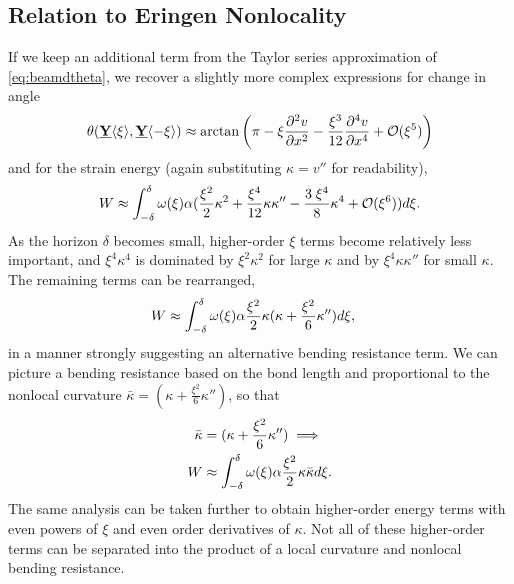 \subsection{Relation to Eringen Nonlocality}
\label{sec:EringenCompare}
If we keep an additional term from the Taylor series approximation of \cref{eq:beamdtheta}, we recover a slightly more complex expressions for change in angle
%
\begin{equation}
\label{eq:beamdthetaHOT}
\theta(\vstate{Y}{}{\xi},\vstate{Y}{}{\mathbf{-\xi}}) \approx \arctan\left(\pi-\xi \frac{\partial^2 v}{\partial x^2} -\frac{\xi^3}{12} \frac{\partial^4 v}{\partial x^4}  +\mathcal{O}(\xi^5)\right)\notag
\end{equation}
%
and for the strain energy (again substituting \(\kappa = v''\) for readability),
%
%
%
\begin{equation}
W \approx \int_{-\delta}^\delta \omega(\xi)\alpha(\frac{\xi^2}{2}\kappa^2+\frac{\xi^4}{12}\kappa\kappa''-\frac{3\; \xi^4}{8}\kappa^4+\mathcal{O}(\xi^6)) d\xi.\notag
\end{equation}
%
As the horizon \(\delta\) becomes small, higher-order \(\xi\) terms become relatively less important, and \(\xi^4\kappa^4\) is dominated by \(\xi^2\kappa^2\) for large \(\kappa\) and by \(\xi^4\kappa\kappa''\) for small \(\kappa\).
The remaining terms can be rearranged,
\begin{align}
W &\approx \int_{-\delta}^\delta \omega(\xi)\alpha \frac{\xi^2}{2}\kappa(\kappa + \frac{\xi^2}{6}\kappa'') d\xi, \notag
\end{align}
in a manner strongly suggesting an alternative bending resistance term.
We can picture a bending resistance based on the bond length and proportional to the nonlocal curvature  \(\bar{\kappa}=(\kappa + \frac{\xi^2}{6}\kappa'')\), so that 
%
\begin{align}
\label{eq:NLbending}
\bar{\kappa}&=(\kappa + \frac{\xi^2}{6}\kappa'') \implies  \\
W &\approx \int_{-\delta}^\delta \omega(\xi)\alpha \frac{\xi^2}{2}\kappa\bar{\kappa}d\xi .\notag
\end{align}
%  
The same analysis can be taken further to obtain higher-order energy terms with even powers of \(\xi\) and even order derivatives of \(\kappa\). 
Not all of these higher-order terms can be separated into the product of a local curvature and nonlocal bending resistance.

